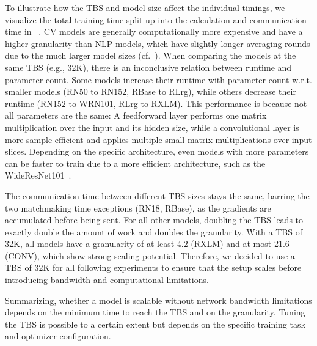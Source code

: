 To illustrate how the TBS and model size affect the individual timings, we visualize the total training time split up into the calculation and communication time in ~.
CV models are generally computationally more expensive and have a higher granularity than NLP models, which have slightly longer averaging rounds due to the much larger model sizes (cf.~).
When comparing the models at the same TBS (e.g., 32K), there is an inconclusive relation between runtime and parameter count.
Some models increase their runtime with parameter count w.r.t. smaller models (RN50 to RN152, RBase to RLrg), while others decrease their runtime (RN152 to WRN101, RLrg to RXLM).
This performance is because not all parameters are the same: A feedforward layer performs one matrix multiplication over the input and its hidden size, while a convolutional layer is more sample-efficient and applies multiple small matrix multiplications over input slices.
Depending on the specific architecture, even models with more parameters can be faster to train due to a more efficient architecture, such as the WideResNet101~\cite{zagoruyko2016wide}.

The communication time between different TBS sizes stays the same, barring the two matchmaking time exceptions (RN18, RBase), as the gradients are accumulated before being sent.
For all other models, doubling the TBS leads to exactly double the amount of work and doubles the granularity. 
With a TBS of 32K, all models have a granularity of at least 4.2 (RXLM) and at most 21.6 (CONV), which show strong scaling potential. 
Therefore, we decided to use a TBS of 32K for all following experiments to ensure that the setup scales before introducing bandwidth and computational limitations.

Summarizing, whether a model is scalable without network bandwidth limitations depends on the minimum time to reach the TBS and on the granularity.
Tuning the TBS is possible to a certain extent but depends on the specific training task and optimizer configuration.

